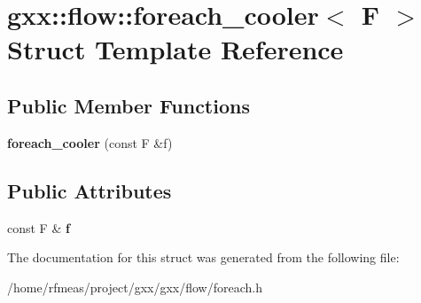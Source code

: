 \hypertarget{structgxx_1_1flow_1_1foreach__cooler}{}\section{gxx\+:\+:flow\+:\+:foreach\+\_\+cooler$<$ F $>$ Struct Template Reference}
\label{structgxx_1_1flow_1_1foreach__cooler}
\subsection*{Public Member Functions}
\begin{DoxyCompactItemize}
\item 
{\bfseries foreach\+\_\+cooler} (const F \&f)\hypertarget{structgxx_1_1flow_1_1foreach__cooler_a18f42034776a6e62f1183e1a47344209}{}\label{structgxx_1_1flow_1_1foreach__cooler_a18f42034776a6e62f1183e1a47344209}

\end{DoxyCompactItemize}
\subsection*{Public Attributes}
\begin{DoxyCompactItemize}
\item 
const F \& {\bfseries f}\hypertarget{structgxx_1_1flow_1_1foreach__cooler_a32e3957cb61f84943e6df6e57ac5d72e}{}\label{structgxx_1_1flow_1_1foreach__cooler_a32e3957cb61f84943e6df6e57ac5d72e}

\end{DoxyCompactItemize}


The documentation for this struct was generated from the following file\+:\begin{DoxyCompactItemize}
\item 
/home/rfmeas/project/gxx/gxx/flow/foreach.\+h\end{DoxyCompactItemize}
